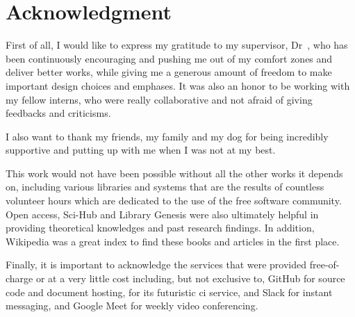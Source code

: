 \chapter{Acknowledgment}
First of all, I would like to express my gratitude to my supervisor,
Dr~\thesupervisor, who has been continuously
encouraging and pushing me out of my comfort zones and deliver better works,
while giving me a generous amount of freedom to make important design choices
and emphases.  It was also an honor to be working with my fellow interns,
who were really collaborative and not afraid of giving feedbacks and criticisms.

I also want to thank my friends, my family and my dog for being incredibly
supportive and putting up with me when I was not at my best.

This work would not have been possible without all the other works it depends
on, including various libraries and systems that are the results of countless
volunteer hours which are dedicated to the use of the free software community.
Open access, Sci-Hub and Library Genesis were also ultimately helpful
in providing theoretical knowledges and past research findings.  In addition,
Wikipedia was a great index to find these books and articles in the first place.

Finally, it is important to acknowledge the services that were provided
free-of-charge or at a very little cost including, but not exclusive to,
GitHub for source code and document hosting,  for its futuristic
\gls{ci} service,  and Slack for instant messaging,
and Google Meet for weekly video conferencing.
